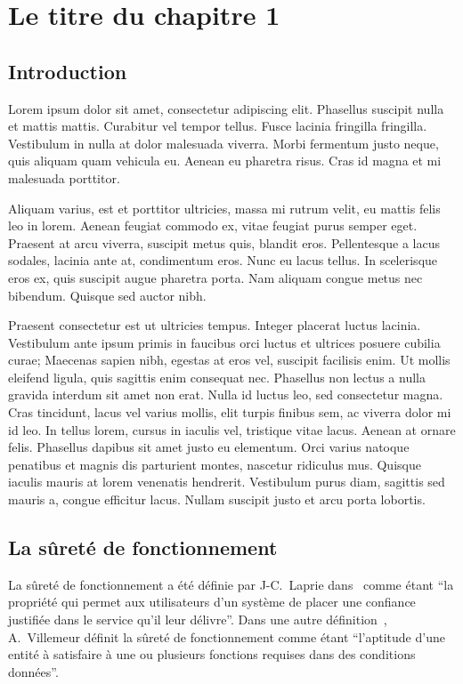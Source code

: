 %
\chapter{Le titre du chapitre 1}
%
\section{Introduction}
Lorem ipsum dolor sit amet, consectetur adipiscing elit. Phasellus suscipit nulla et mattis mattis. Curabitur vel tempor tellus. 
Fusce lacinia fringilla fringilla. Vestibulum in nulla at dolor malesuada viverra. Morbi fermentum justo neque, quis aliquam quam vehicula eu. 
Aenean eu pharetra risus. Cras id magna et mi malesuada porttitor.

Aliquam varius, est et porttitor ultricies, massa mi rutrum velit, eu mattis felis leo in lorem. 
Aenean feugiat commodo ex, vitae feugiat purus semper eget. Praesent at arcu viverra, suscipit metus quis, blandit eros. 
Pellentesque a lacus sodales, lacinia ante at, condimentum eros. Nunc eu lacus tellus. In scelerisque eros ex, quis suscipit augue pharetra porta. 
Nam aliquam congue metus nec bibendum. Quisque sed auctor nibh.

Praesent consectetur est ut ultricies tempus. Integer placerat luctus lacinia. 
Vestibulum ante ipsum primis in faucibus orci luctus et ultrices posuere cubilia curae; Maecenas sapien nibh, egestas at eros vel, suscipit facilisis enim. 
Ut mollis eleifend ligula, quis sagittis enim consequat nec. Phasellus non lectus a nulla gravida interdum sit amet non erat. 
Nulla id luctus leo, sed consectetur magna. Cras tincidunt, lacus vel varius mollis, elit turpis finibus sem, ac viverra dolor mi id leo. 
In tellus lorem, cursus in iaculis vel, tristique vitae lacus. Aenean at ornare felis. Phasellus dapibus sit amet justo eu elementum. 
Orci varius natoque penatibus et magnis dis parturient montes, nascetur ridiculus mus. Quisque iaculis mauris at lorem venenatis hendrerit. 
Vestibulum purus diam, sagittis sed mauris a, congue efficitur lacus. Nullam suscipit justo et arcu porta lobortis.

\section{La sûreté de fonctionnement}
La sûreté de fonctionnement a été définie par J-C.~Laprie dans~\cite{laprie1985dependable} comme étant
\enquote{la propriété qui permet aux utilisateurs d'un système de placer une confiance justifiée dans le service qu'il leur délivre}.
Dans une autre définition~\cite{villemeur1988surete}, A.~Villemeur définit la sûreté de fonctionnement
comme étant \enquote{l'aptitude d'une entité à satisfaire à une ou plusieurs fonctions requises dans des conditions données}.

